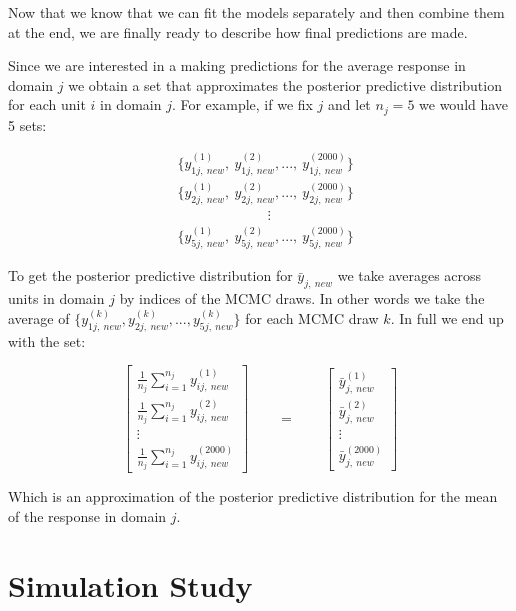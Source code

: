 \documentclass[12pt,twoside]{reedthesis}
\begin{document}
Now that we know that we can fit the models separately and then combine them at the end, we are finally ready to describe how final predictions are made.

Since we are interested in a making predictions for the average response in domain \(j\) we obtain a set that approximates the posterior predictive distribution for each unit \(i\) in domain \(j\). For example, if we fix \(j\) and let \(n_j = 5\) we would have 5 sets:

\[
\begin{aligned}
&\Big\{y_{1j , \ new}^{(1)}, \ y_{1j, \ new}^{(2)}, ..., \ y_{1j, \ new}^{(2000)}\Big\} \\
&\Big\{y_{2j , \ new}^{(1)}, \ y_{2j, \ new}^{(2)}, ...,  \ y_{2j, \ new}^{(2000)}\Big\} \\
& \qquad \qquad \qquad \ \   \vdots \\
&\Big\{y_{5j , \ new}^{(1)}, \ y_{5j, \ new}^{(2)}, ..., \ y_{5j, \ new}^{(2000)}\Big\}
\end{aligned}
\]

To get the posterior predictive distribution for \(\bar{y}_{j, \ new}\) we take averages across units in domain \(j\) by indices of the MCMC draws. In other words we take the average of \(\Big\{y_{1j, \ new}^{(k)}, y_{2j, \ new}^{(k)}, ... , y_{5j, \ new}^{(k)}\Big\}\) for each MCMC draw \(k\). In full we end up with the set:

\[
\begin{bmatrix}
\frac{1}{n_j} \sum_{i = 1}^{n_j}y_{ij, \ new}^{(1)} \\
\frac{1}{n_j} \sum_{i = 1}^{n_j}y_{ij, \ new}^{(2)} \\
\vdots \\
\frac{1}{n_j} \sum_{i = 1}^{n_j}y_{ij, \ new}^{(2000)}
\end{bmatrix} \qquad = \qquad 
\begin{bmatrix}
\bar{y}_{j, \ new}^{(1)} \\
\bar{y}_{j, \ new}^{(2)} \\
\vdots \\
\bar{y}_{j, \ new}^{(2000)}
\end{bmatrix}
\]

Which is an approximation of the posterior predictive distribution for the mean of the response in domain \(j\).

\hypertarget{sim-study}{%
\chapter{Simulation Study}\label{sim-study}}
\end{document}
